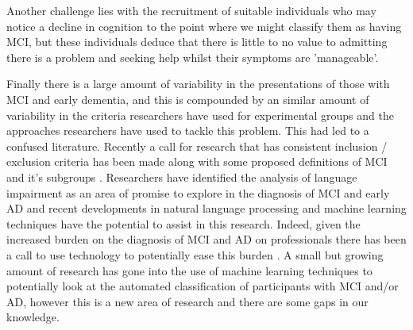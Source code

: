 \documentclass[10pt, letterpaper, twoside, openany]{book}
\begin{document}
\par 
Another challenge lies with the recruitment of suitable individuals who may notice a decline in cognition to the point where we might classify them as having MCI, but these individuals deduce that there is little to no value to admitting there is a problem and seeking help whilst their symptoms are 'manageable'.
\par
Finally there is a large amount of variability in the presentations of those with MCI and early dementia, and this is compounded by an similar amount of variability in the criteria researchers have used for experimental groups and the approaches researchers have used to tackle this problem. This had led to a confused literature. Recently a call for research that has consistent inclusion / exclusion criteria has been made along with some proposed definitions of MCI and it's subgroups \cite{Petersen2014}. Researchers have identified the analysis of language impairment as an area of promise to explore in the diagnosis of MCI and early AD and recent developments in natural language processing and machine learning techniques have the potential to assist in this research. Indeed, given the increased burden on the diagnosis of MCI and AD on professionals there has been a call to use technology to potentially ease this burden \cite{Boschi2017}. A small but growing amount of research has gone into the use of machine learning techniques to potentially look at the automated classification of participants with MCI and/or AD, however this is a new area of research and there are some gaps in our knowledge.
\end{document}
